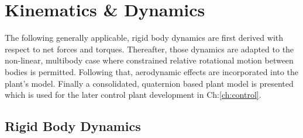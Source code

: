 \chapter{Kinematics \& Dynamics}
\label{ch:dynamics}
The following generally applicable, rigid body dynamics are first derived with respect to net forces and torques. Thereafter, those dynamics are adapted to the non-linear, multibody case where constrained relative rotational motion between bodies is permitted. Following that, aerodynamic effects are incorporated into the plant's model. Finally a consolidated, quaternion based plant model is presented which is used for the later control plant development in Ch:\ref{ch:control}.
\section{Rigid Body Dynamics}
\label{sec:dynamics.rigidbody}
